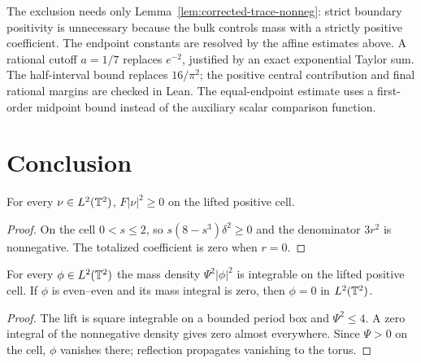 \begin{remark}
The exclusion needs only Lemma~\ref{lem:corrected-trace-nonneg}: strict
boundary positivity is unnecessary because the bulk controls mass with a
strictly positive coefficient.
The endpoint constants are resolved by the affine estimates above.
A rational cutoff $a=1/7$ replaces $e^{-2}$, justified by an exact
exponential Taylor sum. The half-interval bound replaces $16/\pi^2$;
the positive central contribution and final rational margins are checked
in Lean. The equal-endpoint estimate uses a first-order midpoint bound
instead of the auxiliary scalar comparison function.
\end{remark}

\section{Conclusion}

\begin{lemma}
\label{lem:dd-vorticity-density-nonneg}
\leanok
For every $\nu\in L^2(\mathbb{T}^2)$, $F|\nu|^2\ge0$ on the lifted positive cell.
\end{lemma}

\begin{proof}
\leanok
On the cell $0<s\le2$, so $s(8-s^3)\delta^2\ge0$ and the denominator
$3r^2$ is nonnegative. The totalized coefficient is zero when $r=0$.
\end{proof}

\begin{lemma}
\label{lem:dd-mass-vanishing}
\leanok
For every $\phi\in L^2(\mathbb{T}^2)$ the mass density $\Psi^2|\phi|^2$ is
integrable on the lifted positive cell. If $\phi$ is even--even and its
mass integral is zero, then $\phi=0$ in $L^2(\mathbb{T}^2)$.
\end{lemma}

\begin{proof}
\leanok
The lift is square integrable on a bounded period box and $\Psi^2\le4$.
A zero integral of the nonnegative density gives zero almost everywhere.
Since $\Psi>0$ on the cell, $\phi$ vanishes there; reflection propagates
vanishing to the torus.
\end{proof}


